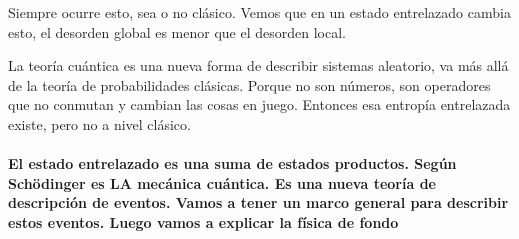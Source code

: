 Siempre ocurre esto, sea o no clásico. Vemos que en un estado entrelazado
cambia esto, el desorden global es menor que el desorden local.

La teoría cuántica es una nueva forma de describir sistemas aleatorio,
va más allá de la teoría de probabilidades clásicas. Porque no son
números, son operadores que no conmutan y cambian las cosas en juego.
Entonces esa entropía entrelazada existe, pero no a nivel clásico. 

\paragraph*{El estado entrelazado es una suma de estados productos. Según Schödinger
es LA mecánica cuántica. Es una nueva teoría de descripción de eventos.
Vamos a tener un marco general para describir estos eventos. Luego
vamos a explicar la física de fondo }
